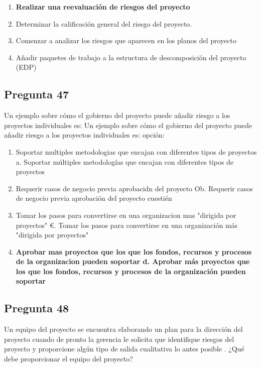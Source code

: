 \documentclass[11pt,a4paper]{article}
\begin{document}
\begin{enumerate}[label=\alph*)]
  \item \textbf{Realizar una reevaluación de riesgos del proyecto}
  \item Determinar la calificación general del riesgo del proyecto.
  \item Comenzar a analizar los riesgos que aparecen en los planos del proyecto
  \item Añadir paquetes de trabajo a la estructura de descomposición del proyecto (EDP)
\end{enumerate}

\subsection*{Pregunta 47}
Un ejemplo sobre cómo el gobierno del proyecto puede añadir riesgo a los proyectos individuales es: Un ejemplo sobre cómo el gobierno del proyecto puede añadir riesgo a los proyectos individuales es: opción:

\begin{enumerate}[label=\alph*)]
  \item Soportar multiples metodologias que encajan con diferentes tipos de proyectos a. Soportar múltiples metodologías que encajan con diferentes tipos de proyectos
  \item Requerir casos de negocio previa aprobacidn del proyecto Ob. Requerir casos de negocio previa aprobación del proyecto cuestién
  \item Tomar los pasos para convertirse en una organizacion mas "dirigida por proyectos" €. Tomar los pasos para convertirse en una organización más "dirigida por proyectos"
  \item \textbf{Aprobar mas proyectos que los que los fondos, recursos y procesos de la organizacion pueden soportar d. Aprobar más proyectos que los que los fondos, recursos y procesos de la organización pueden soportar}
\end{enumerate}

\subsection*{Pregunta 48}
Un equipo del proyecto se encuentra elaborando un plan para la dirección del proyecto cuando de pronto la gerencia le solicita que identifique riesgos del proyecto y proporcione algún tipo de salida cualitativa lo antes posible . ¿Qué debe proporcionar el equipo del proyecto?
\end{document}
